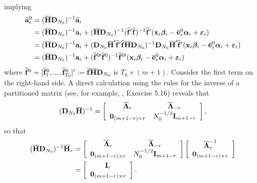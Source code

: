 \documentclass[12pt,fleqn]{article}
\begin{document}
implying
\begin{align}
\widehat{\mathbf{a}}_i^0 & = (\overline{\mathbf{H}}\mathbf{D}_{N_0})^{-1}\widehat{\mathbf{a}}_i \notag\\
& = (\overline{\mathbf{H}}\mathbf{D}_{N_0})^{-1}\mathbf{a}_i + (\overline{\mathbf{H}}\mathbf{D}_{N_0})^{-1}(\widehat{\mathbf{f}}'\widehat{\mathbf{f}})^{-1}\widehat{\mathbf{f}}'(\mathbf{x}_{i}\boldsymbol{\beta}_i - \overline{\mathbf{e}}_{r}^0\boldsymbol{\alpha}_i +  \boldsymbol{\varepsilon}_{i} )\notag\\
& = (\overline{\mathbf{H}}\mathbf{D}_{N_0})^{-1}\mathbf{a}_i +  (
\mathbf{D}_{N_0}\overline{\mathbf{H}}'\widehat{\mathbf{f}}'\widehat{\mathbf{f}}\overline{\mathbf{H}}\mathbf{D}_{N_0})^{-1}\mathbf{D}_{N_0}\overline{\mathbf{H}}'\widehat{\mathbf{f}}' ( \mathbf{x}_{i}\boldsymbol{\beta}_i  - \overline{\mathbf{e}}_{r}^0\boldsymbol{\alpha}_i +  \boldsymbol{\varepsilon}_{i})
\notag\\
& = (\overline{\mathbf{H}}\mathbf{D}_{N_0})^{-1}\mathbf{a}_i + (\widehat{\mathbf{f}}^{0\prime}\widehat{\mathbf{f}}^0)^{-1}\widehat{\mathbf{f}}^{0\prime}( \mathbf{x}_{i}\boldsymbol{\beta}_i - \overline{\mathbf{e}}_{r}^0\boldsymbol{\alpha}_i +  \boldsymbol{\varepsilon}_{i} )
\end{align}
where $\widehat{\mathbf{f}}^0 = [\widehat{\mathbf{f}}_1^0,...,\widehat{\mathbf{f}}_{T_0}^0]':= \widehat{\mathbf{f}}\overline{\mathbf{H}}\mathbf{D}_{N_0}$ is $T_0\times (m+1)$. Consider the first term on the right-hand side. A direct calculation using the rules for the inverse of a partitioned matrix (see, for example, \citealp{abadir2005matrix}, Exercise 5.16) reveals that
\begin{equation}
    (\mathbf{D}_{N_0}\overline{\mathbf{H}})^{-1} =\left[\begin{array}{cc}\overline{\boldsymbol{\Lambda}}_r & \overline{\boldsymbol{\Lambda}}_{-r}\\
    \mathbf{0}_{(m+1-r)\times r} & N_0^{-1/2}\mathbf{I}_{m+1-r}\end{array}\right],
\end{equation}
so that
\begin{align}
(\overline{\mathbf{H}}\mathbf{D}_{N_0})^{-1}\overline{\mathbf{H}}_{r} &= \left[\begin{array}{cc}\overline{\boldsymbol{\Lambda}}_r & \overline{\boldsymbol{\Lambda}}_{-r}\\
    \mathbf{0}_{(m+1-r)\times r} & N_0^{-1/2}\mathbf{I}_{m+1-r}\end{array}\right]\left[\begin{array}{c}\overline{\boldsymbol{\Lambda}}_r^{-1} \\
    \mathbf{0}_{(m+1-r)\times r} \end{array}\right] \notag\\
    & = \left[\begin{array}{c} \mathbf{I}_r \\
    \mathbf{0}_{(m+1-r)\times r} \end{array}\right].
\end{align}
\end{document}
